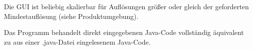 \newpage


Die GUI ist beliebig skalierbar für Auflösungen größer oder gleich der geforderten Mindestauflösung (siehe Produktumgebung).


Das Programm behandelt direkt eingegebenen Java-Code vollständig äquivalent zu aus einer .java-Datei eingelesenem Java-Code.
